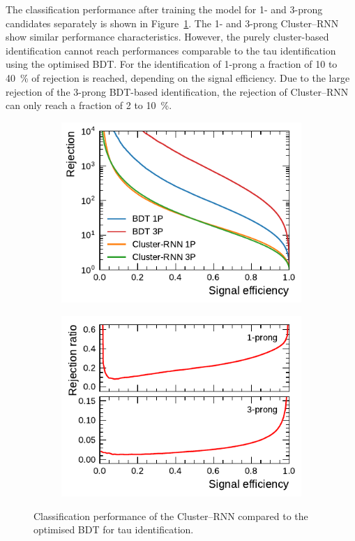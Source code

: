 The classification performance after training the model for 1- and 3-prong
\tauhadvis candidates separately is shown in
Figure~\ref{fig:cluster_rnn_roc_ratios}. The 1- and 3-prong Cluster--RNN show
similar performance characteristics. However, the purely cluster-based
identification cannot reach performances comparable to the tau identification
using the optimised BDT. For the identification of 1-prong \tauhadvis a fraction
of \num{10} to \SI{40}{\percent} of rejection is reached, depending on the
signal efficiency. Due to the large rejection of the 3-prong BDT-based
identification, the rejection of Cluster--RNN can only reach a fraction of
\num{2} to \SI{10}{\percent}.

\begin{figure}[htb]
  \begin{subfigure}[t]{0.48\textwidth}
    \centering
    \includegraphics{./figures/rnn/cluster/roc.pdf}
  \end{subfigure}\hfill
  \begin{subfigure}[t]{0.48\textwidth}
    \centering
    \includegraphics{./figures/rnn/cluster/ratios.pdf}
  \end{subfigure}
  \caption{Classification performance of the Cluster--RNN compared to the
    optimised BDT for tau identification.}
  \label{fig:cluster_rnn_roc_ratios}
\end{figure}

